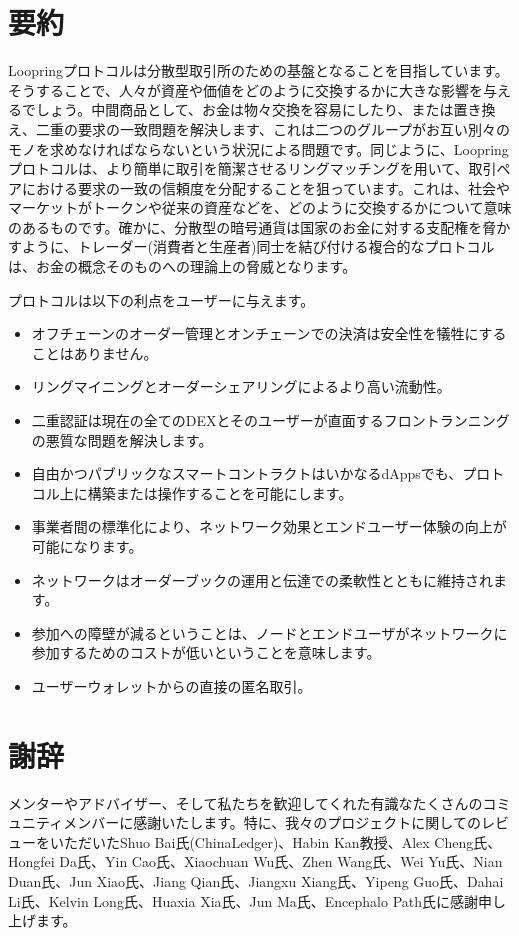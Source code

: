 \documentclass{article}
\begin{document}
\begin{multicols}{2}
\section{要約}

Loopringプロトコルは分散型取引所のための基盤となることを目指しています。そうすることで、人々が資産や価値をどのように交換するかに大きな影響を与えるでしょう。中間商品として、お金は物々交換を容易にしたり、または置き換え、二重の要求の一致問題\cite{unenumerated2006}を解決します、これは二つのグループがお互い別々のモノを求めなければならないという状況による問題です。同じように、Loopringプロトコルは、より簡単に取引を簡潔させるリングマッチングを用いて、取引ペアにおける要求の一致の信頼度を分配することを狙っています。これは、社会やマーケットがトークンや従来の資産などを、どのように交換するかについて意味のあるものです。確かに、分散型の暗号通貨は国家のお金に対する支配権を脅かすように、トレーダー(消費者と生産者)同士を結び付ける複合的なプロトコルは、お金の概念そのものへの理論上の脅威となります。

プロトコルは以下の利点をユーザーに与えます。

\begin{itemize}
	\item オフチェーンのオーダー管理とオンチェーンでの決済は安全性を犠牲にすることはありません。
	\item リングマイニングとオーダーシェアリングによるより高い流動性。
	\item 二重認証は現在の全てのDEXとそのユーザーが直面するフロントランニングの悪質な問題を解決します。
	\item 自由かつパブリックなスマートコントラクトはいかなるdAppsでも、プロトコル上に構築または操作することを可能にします。
	\item 事業者間の標準化により、ネットワーク効果とエンドユーザー体験の向上が可能になります。
	\item ネットワークはオーダーブックの運用と伝達での柔軟性とともに維持されます。
	\item 参加への障壁が減るということは、ノードとエンドユーザがネットワークに参加するためのコストが低いということを意味します。
	\item ユーザーウォレットからの直接の匿名取引。
\end{itemize}

\section{謝辞}
メンターやアドバイザー、そして私たちを歓迎してくれた有識なたくさんのコミュニティメンバーに感謝いたします。特に、我々のプロジェクトに関してのレビューをいただいたShuo Bai氏(ChinaLedger)、Habin Kan教授、Alex Cheng氏、Hongfei Da氏、Yin Cao氏、Xiaochuan Wu氏、Zhen Wang氏、Wei Yu氏、Nian Duan氏、Jun Xiao氏、Jiang Qian氏、Jiangxu Xiang氏、Yipeng Guo氏、Dahai Li氏、Kelvin Long氏、Huaxia Xia氏、Jun Ma氏、Encephalo Path氏に感謝申し上げます。






\end{multicols}
\end{document}
